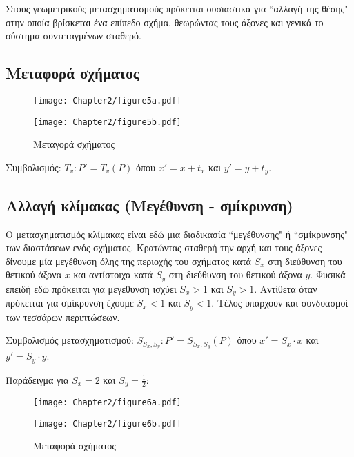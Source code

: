Στους γεωμετρικούς μετασχηματισμούς πρόκειται ουσιαστικά για ``αλλαγή της θέσης" στην οποία βρίσκεται ένα επίπεδο σχήμα, θεωρώντας τους άξονες και γενικά το σύστημα συντεταγμένων σταθερό.

\subsection{Μεταφορά σχήματος}

\begin{figure}[h!]
\begin{center}
\begin{minipage}[b]{0.48\textwidth} %
    \texttt{[image: Chapter2/figure5a.pdf]}
\end{minipage}%
\hfill
\begin{minipage}[b]{0.48\textwidth} %
    \texttt{[image: Chapter2/figure5b.pdf]}
\end{minipage}

\end{center}
  \caption{Μεταγορά σχήματος}
\end{figure}

Συμβολισμός: $T_v : P' = T_v(P)$ όπου $x' = x + t_x$ και $y' = y + t_y$.

\subsection{Αλλαγή κλίμακας (Μεγέθυνση - σμίκρυνση)}

Ο μετασχηματισμός κλίμακας είναι εδώ μια διαδικασία ``μεγέθυνσης" ή ``σμίκρυνσης" των διαστάσεων ενός σχήματος. Κρατώντας σταθερή την αρχή και τους άξονες δίνουμε μία μεγέθυνση όλης της περιοχής του σχήματος κατά $S_x$ στη διεύθυνση του θετικού άξονα $x$ και αντίστοιχα κατά $S_y$ στη διεύθυνση του θετικού άξονα $y$. Φυσικά επειδή εδώ πρόκειται για μεγέθυνση ισχύει $S_x > 1$ και $S_y > 1$. Αντίθετα όταν πρόκειται για σμίκρυνση έχουμε $S_x < 1$ και $S_y < 1$. Τέλος υπάρχουν και συνδυασμοί των τεσσάρων περιπτώσεων.

Συμβολισμός μετασχηματισμού: $S_{S_x, S_y} : P' = S_{S_x, S_y}(P)$ όπου $x' = S_x \cdot x$ και $y' = S_y \cdot y$.


Παράδειγμα για $S_x = 2$ και $S_y = \frac{1}{2}$:

\begin{figure}[h!]
	\begin{center}
		\begin{minipage}[b]{0.48\textwidth}
		    \texttt{[image: Chapter2/figure6a.pdf]}
		\end{minipage}
		\hfill
		\begin{minipage}[b]{0.48\textwidth} 
		    \texttt{[image: Chapter2/figure6b.pdf]}
		\end{minipage}
	\end{center}
	\caption{Μεταφορά σχήματος}
\end{figure}

